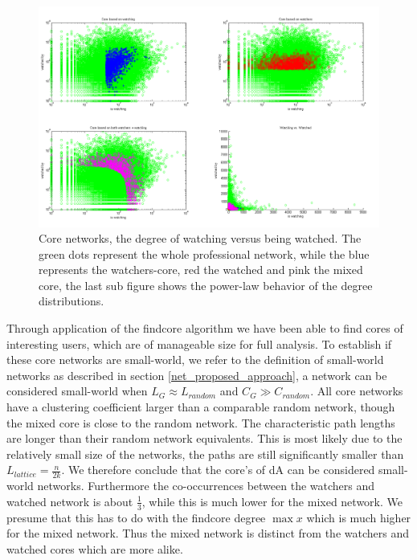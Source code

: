 \begin{figure}[htb]
  \centering
  \includegraphics[width=1\linewidth]{img/core.png}
  \caption{Core networks, the degree of watching versus being watched.  The green dots represent the whole professional network, while the blue represents the watchers-core, red the watched and pink the mixed core, the last sub figure shows the power-law behavior of the degree distributions.}
  \label{fig:results_core}
\end{figure}

Through application of the findcore algorithm we have been able to find cores of interesting users, which are of manageable size for full analysis. To establish if these core networks are small-world, we refer to the definition of small-world networks as described in section \ref{net_proposed_approach}, a network can be considered small-world when $L_G\approx L_{random}$ and $C_G \gg C_{random}$. All core networks have a clustering coefficient larger than a comparable random network, though the mixed core is close to the random network. The characteristic path lengths are longer than their random network equivalents. This is most likely due to the relatively small size of the networks, the paths are still significantly smaller than $L_{lattice}=\frac{n}{2k}$. We therefore conclude that the core's of dA can be considered small-world networks.  
Furthermore the co-occurrences between the watchers and watched network is about $\frac{1}{3}$, while this is much lower for the mixed network. We presume that this has to do with the findcore degree $\max x$ which is much higher for the mixed network. Thus the mixed network is distinct from the watchers and watched cores which are more alike.



